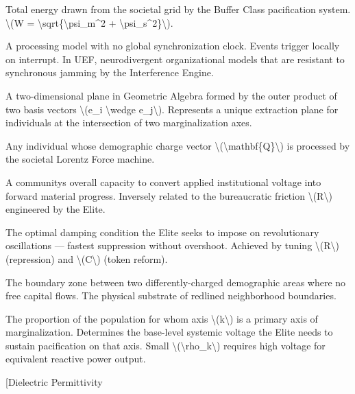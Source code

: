 {\begin{description}
\tightlist
\item[Apparent Power (VA)]
Total energy drawn from the societal grid by the Buffer Class
pacification system. \textbackslash(\textbar W\textbar{} =
\textbackslash sqrt\{\textbackslash psi\_m\^{}2 +
\textbackslash psi\_s\^{}2\}\textbackslash).
\item[Asynchronous Architecture]
A processing model with no global synchronization clock. Events trigger
locally on interrupt. In UEF, neurodivergent organizational models that
are resistant to synchronous jamming by the Interference Engine.
\item[Bivector]
A two-dimensional plane in Geometric Algebra formed by the outer product
of two basis vectors \textbackslash(e\_i \textbackslash wedge
e\_j\textbackslash). Represents a unique extraction plane for
individuals at the intersection of two marginalization axes.
\item[Charge Carrier]
Any individual whose demographic charge vector
\textbackslash(\textbackslash mathbf\{Q\}\textbackslash) is processed by
the societal Lorentz Force machine.
\item[Conductivity \textbackslash(\textbackslash sigma\textbackslash)]
A community\textquotesingle s overall capacity to convert applied
institutional voltage into forward material progress. Inversely related
to the bureaucratic friction \textbackslash(R\textbackslash) engineered
by the Elite.
\item[Critical Damping (\textbackslash(\textbackslash zeta =
1\textbackslash))]
The optimal damping condition the Elite seeks to impose on revolutionary
oscillations --- fastest suppression without overshoot. Achieved by
tuning \textbackslash(R\textbackslash) (repression) and
\textbackslash(C\textbackslash) (token reform).
\item[Depletion Region]
The boundary zone between two differently-charged demographic areas
where no free capital flows. The physical substrate of redlined
neighborhood boundaries.
\item[Demographic Weight Coefficient
\textbackslash(\textbackslash rho\_k\textbackslash)]
The proportion of the population for whom axis
\textbackslash(k\textbackslash) is a primary axis of marginalization.
Determines the base-level systemic voltage the Elite needs to sustain
pacification on that axis. Small
\textbackslash(\textbackslash rho\_k\textbackslash) requires high
voltage for equivalent reactive power output.
\item[Dielectric Permittivity

\end{description}}
